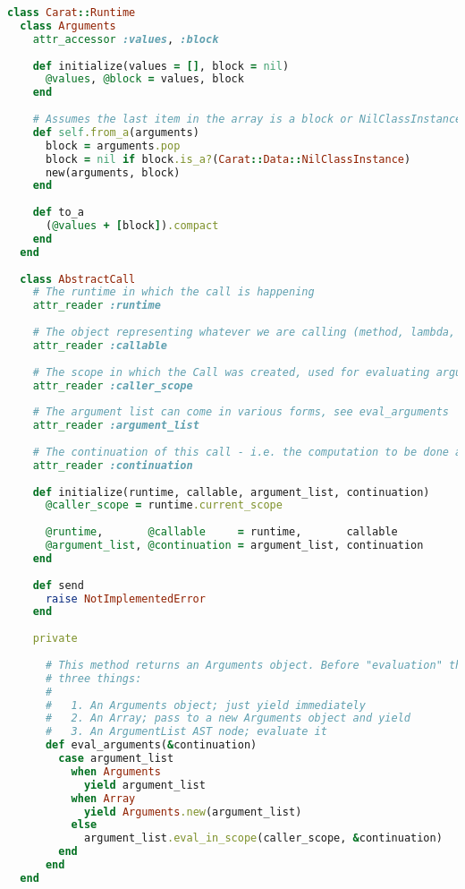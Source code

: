 \begin{lstlisting}[title={\small\Helvetica runtime/call.rb},language=Ruby]
class Carat::Runtime
  class Arguments
    attr_accessor :values, :block
    
    def initialize(values = [], block = nil)
      @values, @block = values, block
    end
    
    # Assumes the last item in the array is a block or NilClassInstance representing no block
    def self.from_a(arguments)
      block = arguments.pop
      block = nil if block.is_a?(Carat::Data::NilClassInstance)
      new(arguments, block)
    end
    
    def to_a
      (@values + [block]).compact
    end
  end
  
  class AbstractCall
    # The runtime in which the call is happening
    attr_reader :runtime
    
    # The object representing whatever we are calling (method, lambda, primitive method, etc)
    attr_reader :callable
    
    # The scope in which the Call was created, used for evaluating arguments
    attr_reader :caller_scope
    
    # The argument list can come in various forms, see eval_arguments
    attr_reader :argument_list
    
    # The continuation of this call - i.e. the computation to be done afterwards
    attr_reader :continuation
    
    def initialize(runtime, callable, argument_list, continuation)
      @caller_scope = runtime.current_scope
      
      @runtime,       @callable     = runtime,       callable
      @argument_list, @continuation = argument_list, continuation
    end
    
    def send
      raise NotImplementedError
    end
    
    private
    
      # This method returns an Arguments object. Before "evaluation" the arguments may be one of
      # three things:
      # 
      #   1. An Arguments object; just yield immediately
      #   2. An Array; pass to a new Arguments object and yield
      #   3. An ArgumentList AST node; evaluate it
      def eval_arguments(&continuation)
        case argument_list
          when Arguments
            yield argument_list
          when Array
            yield Arguments.new(argument_list)
          else
            argument_list.eval_in_scope(caller_scope, &continuation)
        end
      end
  end
  

\end{lstlisting}
